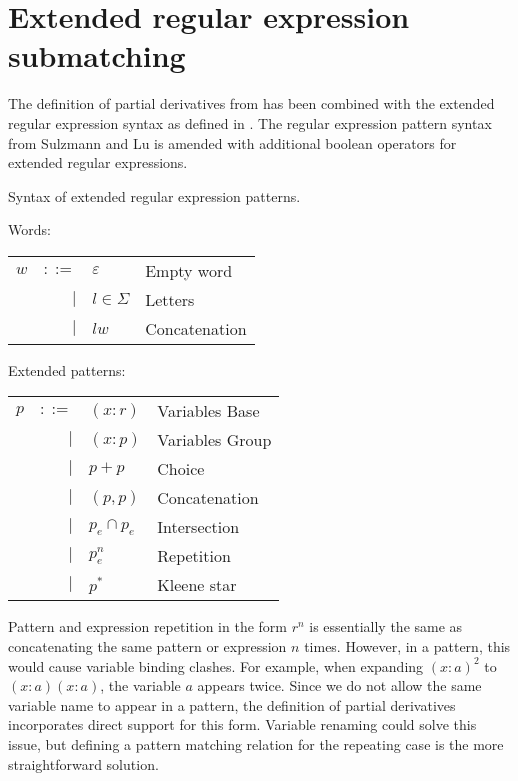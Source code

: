\section{Extended regular expression submatching}
\label{ere-submatch}

The definition of partial derivatives from \cite{pdpat} has been combined with
the extended regular expression syntax as defined in \cite{pdere}. The regular
expression pattern syntax from Sulzmann and Lu is amended with additional
boolean operators for extended regular expressions.

\begin{defn}
   \label{defn-syn}
   Syntax of extended regular expression patterns.

   Words:

   \begin{tabular}{lrll}
      $w$	& $::=$	& $\varepsilon$		& Empty word	\\
		& $|$	& $l \in \Sigma$	& Letters	\\
		& $|$	& $lw$			& Concatenation	\\
   \end{tabular}

   Extended patterns:

   \begin{tabular}{lrll}
      $p$	& $::=$	& $(x:r)$			& Variables Base	\\
		& $|$	& $(x:p)$			& Variables Group	\\
		& $|$	& $p+p$				& Choice		\\
		& $|$	& $(p,p)$			& Concatenation		\\
		& $|$	& $p_e \cap p_e$		& Intersection		\\
        	& $|$	& $p_e^n$			& Repetition		\\
		& $|$	& $p^*$				& Kleene star		\\
   \end{tabular}
\end{defn}


Pattern and expression repetition in the form $r^n$ is essentially the same as
concatenating the same pattern or expression $n$ times. However, in a pattern,
this would cause variable binding clashes. For example, when expanding
$(x:a)^2$ to $(x:a)(x:a)$, the variable $a$ appears twice. Since we do not
allow the same variable name to appear in a pattern, the definition of partial
derivatives incorporates direct support for this form. Variable renaming could
solve this issue, but defining a pattern matching relation for the repeating
case is the more straightforward solution.

